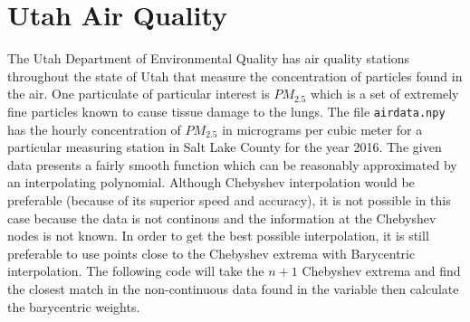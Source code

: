 \section*{Utah Air Quality}

The Utah Department of Environmental Quality has air quality stations throughout the state of Utah that measure the concentration of particles found in the air.
One particulate of particular interest is $PM_{2.5}$ which is a set of extremely fine particles known to cause tissue damage to the lungs.
The file \texttt{airdata.npy} has the hourly concentration of $PM_{2.5}$ in micrograms per cubic meter for a particular measuring station in Salt Lake County for the year 2016.
The given data presents a fairly smooth function which can be reasonably approximated by an interpolating polynomial.
Although Chebyshev interpolation would be preferable (because of its superior speed and accuracy), it is not possible in this case because the data is not continous and the information at the Chebyshev nodes
is not known.
In order to get the best possible interpolation, it is still preferable to use points close to the Chebyshev extrema with Barycentric interpolation.
The following code will take the $n+1$ Chebyshev extrema and find the closest match in the non-continuous data found in the variable  then calculate the barycentric weights.


